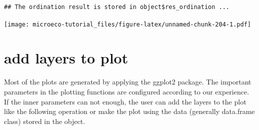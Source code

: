 \documentclass[
]{book}
\newenvironment{Shaded}{\begin{snugshade}}{\end{snugshade}}
\newcommand{\AttributeTok}[1]{\textcolor[rgb]{0.77,0.63,0.00}{#1}}
\newcommand{\ConstantTok}[1]{\textcolor[rgb]{0.00,0.00,0.00}{#1}}
\newcommand{\FunctionTok}[1]{\textcolor[rgb]{0.00,0.00,0.00}{#1}}
\newcommand{\NormalTok}[1]{#1}
\newcommand{\OtherTok}[1]{\textcolor[rgb]{0.56,0.35,0.01}{#1}}
\newcommand{\SpecialCharTok}[1]{\textcolor[rgb]{0.00,0.00,0.00}{#1}}
\newcommand{\StringTok}[1]{\textcolor[rgb]{0.31,0.60,0.02}{#1}}
\begin{document}
\begin{Shaded}
\end{Shaded}

\begin{verbatim}
## The ordination result is stored in object$res_ordination ...
\end{verbatim}

\begin{Shaded}
\end{Shaded}

\texttt{[image: microeco-tutorial\_files/figure-latex/unnamed-chunk-204-1.pdf]}

\hypertarget{add-layers-to-plot}{%
\section{add layers to plot}\label{add-layers-to-plot}}

Most of the plots are generated by applying the ggplot2 package.
The important parameters in the plotting functions are configured according to our experience.
If the inner parameters can not enough, the user can add the layers to the plot like the following operation or
make the plot using the data (generally data.frame class) stored in the object.
\end{document}
